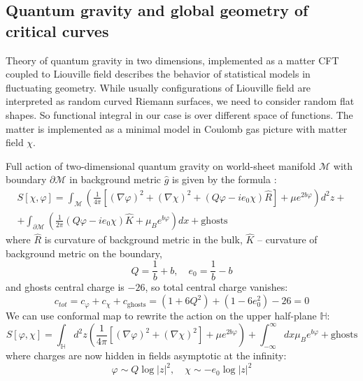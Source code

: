 \documentclass[12pt]{article}
\begin{document}
\subsection{Quantum gravity and global geometry of critical curves}
\label{sec:quant-grav-glob}

Theory of quantum gravity in two dimensions, implemented as a matter CFT coupled to Liouville field
describes the behavior of statistical models in fluctuating geometry. 
While usually configurations of  Liouville field are interpreted as random curved Riemann surfaces,
we need to consider random flat shapes. So functional integral in our case is over different space
of functions. The matter is implemented as a minimal model in Coulomb gas picture with matter field
$\chi$.

Full action of two-dimensional quantum gravity on world-sheet manifold $\mathcal{M}$ with boundary
$\partial \mathcal{M}$ in background metric $\hat g$ is given by the formula \cite{kostov2004boundary}:
\begin{multline}
  \label{eq:160}
  S[\chi,\varphi]=\int_{\mathcal{M}}\left(\frac{1}{4\pi}[(\nabla \varphi)^{2}+(\nabla
    \chi)^{2}+(Q\varphi-ie_{0}\chi)\hat R]+\mu e^{2b\varphi}\right)d^{2}z +\\
  +  \int_{\partial
    \mathcal{M}}\left(\frac{1}{2\pi}(Q\varphi-ie_{0}\chi)\hat K + \mu_{B}e^{b\varphi}\right)dx+\mbox{ghosts}
\end{multline}
where $\hat R$ is curvature of background metric in the bulk, $\hat K$ -- curvature of background
metric on the boundary, 
\begin{equation}
  \label{eq:161}
  Q=\frac{1}{b}+b,\quad e_{0}=\frac{1}{b}-b
\end{equation}
and ghosts central charge is $-26$, so total central charge vanishes:
\begin{equation}
  \label{eq:162}
  c_{tot}=c_{\varphi}+c_{\chi}+c_{\mathrm{ghosts}}=(1+6Q^{2})+(1-6e_{0}^{2})-26=0
\end{equation}
We can use conformal map to rewrite the action on the upper half-plane $\mathbb{H}$:
\begin{equation}
  \label{eq:159}
  S[\varphi,\chi]=\int_{\mathbb{H}} d^{2}z \left(\frac{1}{4\pi}[(\nabla \varphi)^{2}+(\nabla
    \chi)^{2}]+\mu e^{2b\varphi}\right) +\int_{-\infty}^{\infty} dx \mu_{B}e^{b\varphi} + \mbox{ghosts}
\end{equation}
where charges are now hidden in fields asymptotic at the infinity:
\begin{equation}
  \label{eq:163}
  \varphi\sim Q\log|z|^{2},\quad \chi\sim-e_{0}\log|z|^{2}
\end{equation}
\end{document}
